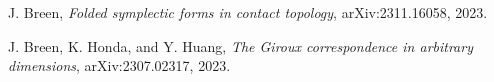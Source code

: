 \documentclass[11pt]{amsart}
\begin{document}
\begin{thebibliography}{}
\begin{comment}
\bibitem[BM03]{BM:Orientations}
F. Bourgeois and K. Mohnke, \textit{Coherent orientations in symplectic field theory}, Math. Z. 248, p.123-146, 2003.

\bibitem[BEE11]{BEE:Product}
F. Bourgeois, T. Ekholm, and Y. Eliashberg, \textit{Symplectic homology product via Legendrian surgery}, PNAS Volume 108, Number 20, p.8114-8121, 2011.

\bibitem[BEE12]{BEE:LegendrianSurgery}
F. Bourgeois, T. Ekholm, and Y. Eliashberg, \textit{Effect of Legendrain Surgery}, Geom. Topol., Volume 16, Number 1, p.301-389, 2012.

\bibitem[BEHW03]{SFTCompactness}
F. Bourgeois, Y. Eliashberg, H. Hofer, and K. Wysocki, \textit{Compactness results in symplectic field theory}, Geom. Topol., Volume 7, Number 2, p.799-888, 2003.

\bibitem[BN10]{AlgebraicallyOvertwisted}
F. Bourgeois and K. Niederkr{\"u}ger, Towards a good definition of algebraically overtwisted,
Expo. Math. 28, no. 1, 85–100, 2010.

\bibitem[BO09a]{BO:MorseBott}
F. Bourgeois and A. Oancea, \textit{Symplectic homology, autonomous Hamiltonians, and Morse–Bott moduli spaces}, Duke Math. J. 146, p.71–174, 2009.

\bibitem[BO09b]{BO:ExactSequence}
F. Bourgeois and A. Oancea, \textit{An exact sequence for contact- and symplectic homology},
Invent. math., Volume 175, p. 611–680, 2009.

\bibitem[BT82]{BottTu}
R. Bott and L. R. Tu, \textit{Differential forms in algebraic topology}, Graduate Texts in Mathematics 82, Springer-Verlag, 1982.
\end{comment}

J. Breen, \textit{Folded symplectic forms in contact topology}, arXiv:2311.16058, 2023.

J. Breen, K. Honda, and Y. Huang, \textit{The Giroux correspondence in arbitrary dimensions}, arXiv:2307.02317, 2023.

\begin{comment}
\bibitem[CGKS14]{CGKS:Polyfilling}
C. Cao, N. Gallup, K. Hayden, J. M. Sabloff, \textit{Topologically Distinct Lagrangian and Symplectic Fillings}, Math. Research Letters, Vol. 21, p.85-99, 2014.

\bibitem[CMP19]{CMP:OT}
R. Casals, E. Murphy, and F. Presas, \textit{Geometric criteria for overtwistedness}, J. Amer. Math. Soc. 32, p.563–604, 2019.
\end{comment}


\end{thebibliography}
\end{document}
